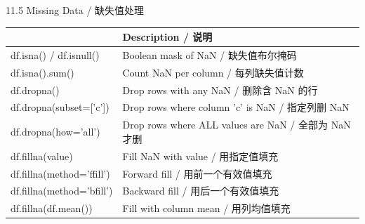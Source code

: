 \documentclass[11pt,a4paper]{report}
\begin{document}
\begin{cmdsection}{11.5  Missing Data / 缺失值处理}
\normalsize\renewcommand{\arraystretch}{1.4}
\centering
\begin{tabularx}{\textwidth}{@{}>{\ttfamily}l>{\raggedright\arraybackslash}X@{}}
\toprule
\multicolumn{1}{@{}l}{\textbf{Syntax}} & \textbf{Description / 说明} \\ \midrule
df.isna() / df.isnull()     & Boolean mask of NaN / 缺失值布尔掩码 \\
df.isna().sum()             & Count NaN per column / 每列缺失值计数 \\
df.dropna()                 & Drop rows with any NaN / 删除含 NaN 的行 \\
df.dropna(subset=['c'])     & Drop rows where column 'c' is NaN / 指定列删 NaN \\
df.dropna(how='all')        & Drop rows where ALL values are NaN / 全部为 NaN 才删 \\
df.fillna(value)            & Fill NaN with value / 用指定值填充 \\
df.fillna(method='ffill')   & Forward fill / 用前一个有效值填充 \\
df.fillna(method='bfill')   & Backward fill / 用后一个有效值填充 \\
df.fillna(df.mean())        & Fill with column mean / 用列均值填充 \\
\bottomrule
\end{tabularx}
\end{cmdsection}
\end{document}
